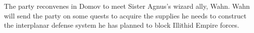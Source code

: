 The party reconvenes in Domov to meet Sister Agnus's wizard ally, Wahn.
Wahn will send the party on some quests to acquire the supplies he needs to construct the interplanar defense system he has planned to block Illithid Empire forces.
